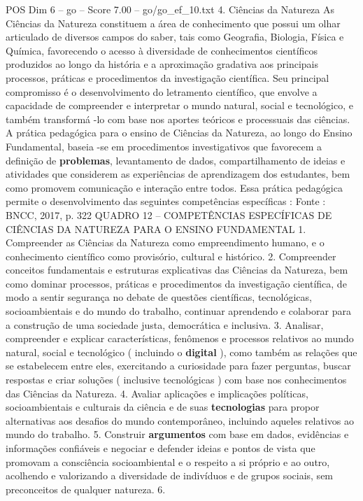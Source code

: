 \begin{textsample}{POS Dim 6 – go – Score 7.00 – go/go\_ef\_10.txt}  \label{ex:f6_pos_120}
4.
Ciências da Natureza As Ciências da Natureza constituem a área de conhecimento que possui um olhar articulado de diversos campos do saber, tais como Geografia, Biologia, Física e Química, favorecendo o acesso à diversidade de conhecimentos científicos produzidos ao longo da história e a aproximação gradativa aos principais processos, práticas e procedimentos da investigação científica.
Seu principal compromisso é o desenvolvimento do letramento científico, que envolve a capacidade de compreender e interpretar o mundo natural, social e tecnológico, e também transformá -lo com base nos aportes teóricos e processuais das ciências.
A prática pedagógica para o ensino de Ciências da Natureza, ao longo do Ensino Fundamental, baseia -se em procedimentos investigativos que favorecem a definição de \textbf{problemas}, levantamento de dados, compartilhamento de ideias e atividades que considerem as experiências de aprendizagem dos estudantes, bem como promovem comunicação e interação entre todos.
Essa prática pedagógica permite o desenvolvimento das seguintes competências específicas : Fonte : BNCC, 2017, p. 322 QUADRO 12 – COMPETÊNCIAS ESPECÍFICAS DE CIÊNCIAS DA NATUREZA PARA O ENSINO FUNDAMENTAL 1.
Compreender as Ciências da Natureza como empreendimento humano, e o conhecimento científico como provisório, cultural e histórico. 2.
Compreender conceitos fundamentais e estruturas explicativas das Ciências da Natureza, bem como dominar processos, práticas e procedimentos da investigação científica, de modo a sentir segurança no debate de questões científicas, tecnológicas, socioambientais e do mundo do trabalho, continuar aprendendo e colaborar para a construção de uma sociedade justa, democrática e inclusiva. 3.
Analisar, compreender e explicar características, fenômenos e processos relativos ao mundo natural, social e tecnológico ( incluindo o \textbf{digital} ), como também as relações que se estabelecem entre eles, exercitando a curiosidade para fazer perguntas, buscar respostas e criar soluções ( inclusive tecnológicas ) com base nos conhecimentos das Ciências da Natureza. 4.
Avaliar aplicações e implicações políticas, socioambientais e culturais da ciência e de suas \textbf{tecnologias} para propor alternativas aos desafios do mundo contemporâneo, incluindo aqueles relativos ao mundo do trabalho. 5.
Construir \textbf{argumentos} com base em dados, evidências e informações confiáveis e negociar e defender ideias e pontos de vista que promovam a consciência socioambiental e o respeito a si próprio e ao outro, acolhendo e valorizando a diversidade de indivíduos e de grupos sociais, sem preconceitos de qualquer natureza. 6.

\end{textsample}
